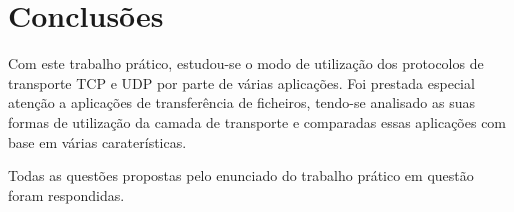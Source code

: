 
\section*{Conclusões}

Com este trabalho prático, estudou-se o modo de utilização dos protocolos de transporte TCP e UDP por parte de várias aplicações. Foi prestada especial atenção a aplicações de transferência de ficheiros, tendo-se analisado as suas formas de utilização da camada de transporte e comparadas essas aplicações com base em várias caraterísticas.

Todas as questões propostas pelo enunciado do trabalho prático em questão foram respondidas.

